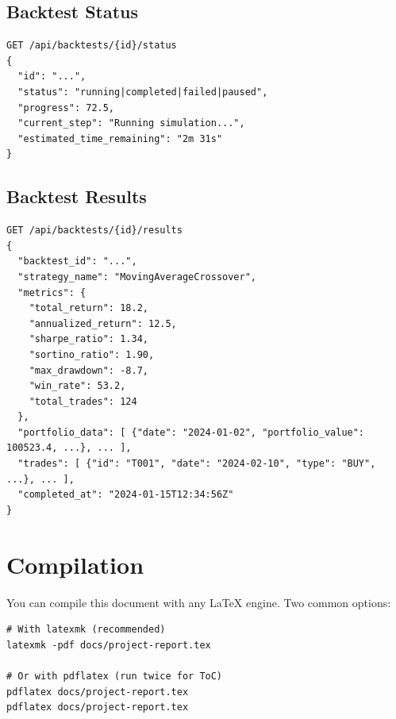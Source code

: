 \documentclass[11pt,a4paper]{article}
\begin{document}
\subsection*{Backtest Status}
\begin{lstlisting}[style=code]
GET /api/backtests/{id}/status
{
  "id": "...",
  "status": "running|completed|failed|paused",
  "progress": 72.5,
  "current_step": "Running simulation...",
  "estimated_time_remaining": "2m 31s"
}
\end{lstlisting}

\subsection*{Backtest Results}
\begin{lstlisting}[style=code]
GET /api/backtests/{id}/results
{
  "backtest_id": "...",
  "strategy_name": "MovingAverageCrossover",
  "metrics": {
    "total_return": 18.2,
    "annualized_return": 12.5,
    "sharpe_ratio": 1.34,
    "sortino_ratio": 1.90,
    "max_drawdown": -8.7,
    "win_rate": 53.2,
    "total_trades": 124
  },
  "portfolio_data": [ {"date": "2024-01-02", "portfolio_value": 100523.4, ...}, ... ],
  "trades": [ {"id": "T001", "date": "2024-02-10", "type": "BUY", ...}, ... ],
  "completed_at": "2024-01-15T12:34:56Z"
}
\end{lstlisting}

\section*{Compilation}
You can compile this document with any LaTeX engine. Two common options:
\begin{lstlisting}[style=code]
# With latexmk (recommended)
latexmk -pdf docs/project-report.tex

# Or with pdflatex (run twice for ToC)
pdflatex docs/project-report.tex
pdflatex docs/project-report.tex
\end{lstlisting}
\end{document}
